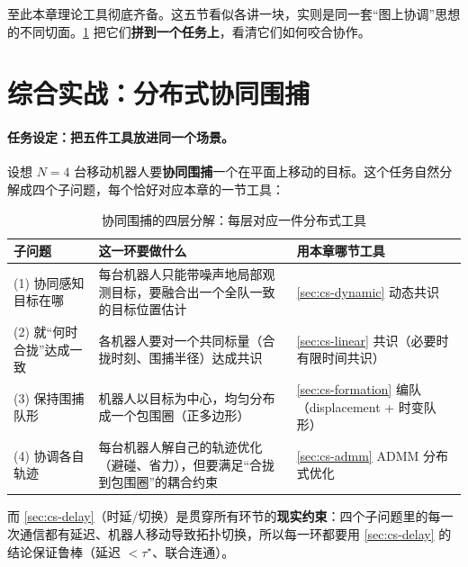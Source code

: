 \noindent 至此本章理论工具彻底齐备。这五节看似各讲一块，实则是同一套“图上协调”思想的不同切面。\cref{sec:cs-integration} 把它们\textbf{拼到一个任务上}，看清它们如何咬合协作。

\section{综合实战：分布式协同围捕}
\label{sec:cs-integration}

\paragraph{任务设定：把五件工具放进同一个场景。}
设想 $N=4$ 台移动机器人要\textbf{协同围捕}一个在平面上移动的目标。这个任务自然分解成四个子问题，每个恰好对应本章的一节工具：

\begin{table}[H]\centering\small
\caption{协同围捕的四层分解：每层对应一件分布式工具}
\label{tab:cs-pursuit-decomp}
\begin{tabular}{p{2.6cm}p{6.2cm}p{3.2cm}}
\toprule
子问题 & 这一环要做什么 & 用本章哪节工具 \\
\midrule
(1) 协同感知目标在哪 & 每台机器人只能带噪声地局部观测目标，要融合出一个全队一致的目标位置估计 & \cref{sec:cs-dynamic} 动态共识 \\
(2) 就“何时合拢”达成一致 & 各机器人要对一个共同标量（合拢时刻、围捕半径）达成共识 & \cref{sec:cs-linear} 共识（必要时有限时间共识） \\
(3) 保持围捕队形 & 机器人以目标为中心，均匀分布成一个包围圈（正多边形） & \cref{sec:cs-formation} 编队（displacement + 时变队形） \\
(4) 协调各自轨迹 & 每台机器人解自己的轨迹优化（避碰、省力），但要满足“合拢到包围圈”的耦合约束 & \cref{sec:cs-admm} ADMM 分布式优化 \\
\bottomrule
\end{tabular}
\end{table}

\noindent 而 \cref{sec:cs-delay}（时延/切换）是贯穿所有环节的\textbf{现实约束}：四个子问题里的每一次通信都有延迟、机器人移动导致拓扑切换，所以每一环都要用 \cref{sec:cs-delay} 的结论保证鲁棒（延迟 $<\tau^\star$、联合连通）。


